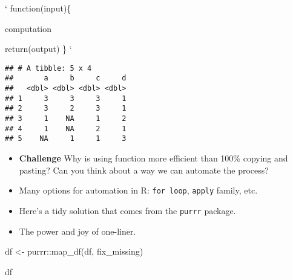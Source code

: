 \documentclass[
]{book}
\newenvironment{Shaded}{\begin{snugshade}}{\end{snugshade}}
\newcommand{\CommentTok}[1]{\textcolor[rgb]{0.56,0.35,0.01}{\textit{#1}}}
\newcommand{\ConstantTok}[1]{\textcolor[rgb]{0.00,0.00,0.00}{#1}}
\newcommand{\ControlFlowTok}[1]{\textcolor[rgb]{0.13,0.29,0.53}{\textbf{#1}}}
\newcommand{\DecValTok}[1]{\textcolor[rgb]{0.00,0.00,0.81}{#1}}
\newcommand{\FunctionTok}[1]{\textcolor[rgb]{0.00,0.00,0.00}{#1}}
\newcommand{\NormalTok}[1]{#1}
\newcommand{\OtherTok}[1]{\textcolor[rgb]{0.56,0.35,0.01}{#1}}
\newcommand{\SpecialCharTok}[1]{\textcolor[rgb]{0.00,0.00,0.00}{#1}}
\begin{document}
`
function(input)\{

computation

return(output)
\}
`

\begin{Shaded}
\end{Shaded}

\begin{verbatim}
## # A tibble: 5 x 4
##       a     b     c     d
##   <dbl> <dbl> <dbl> <dbl>
## 1     3     3     3     1
## 2     3     2     3     1
## 3     1    NA     1     2
## 4     1    NA     2     1
## 5    NA     1     1     3
\end{verbatim}

\begin{itemize}
\item
  \textbf{Challenge} Why is using function more efficient than 100\% copying and pasting? Can you think about a way we can automate the process?
\item
  Many options for automation in R: \texttt{for\ loop}, \texttt{apply} family, etc.
\item
  Here's a tidy solution that comes from the \texttt{purrr} package.
\item
  The power and joy of one-liner.
\end{itemize}

\begin{Shaded}
\begin{Highlighting}[]
\NormalTok{df }\OtherTok{\textless{}{-}}\NormalTok{ purrr}\SpecialCharTok{::}\FunctionTok{map\_df}\NormalTok{(df, fix\_missing)}

\NormalTok{df}
\end{Highlighting}
\end{Shaded}
\end{document}
